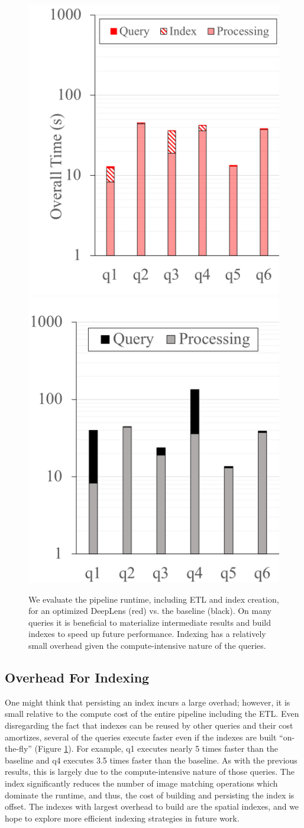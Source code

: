 \begin{figure}[t]
\centering
 \includegraphics[width=0.48\columnwidth]{figures/indexing_b.png}
 \includegraphics[width=0.48\columnwidth]{figures/indexing_a.png}
 \caption{We evaluate the pipeline runtime, including ETL and index creation, for an optimized \textsf{DeepLens} (red) vs. the baseline (black). On many queries it is beneficial to materialize intermediate results and build indexes to speed up future performance. Indexing has a relatively small overhead given the compute-intensive nature of the queries. \label{index} }
\end{figure}

\subsection{Overhead For Indexing}
One might think that persisting an index incurs a large overhad; however, it is small relative to the compute cost of the entire pipeline including the ETL.
Even disregarding the fact that indexes can be reused by other queries and their cost amortizes, several of the queries execute faster even if the indexes are built ``on-the-fly'' (Figure \ref{index}).
For example, q1 executes nearly 5 times faster than the baseline and q4 executes 3.5 times faster than the baseline.
As with the previous results, this is largely due to the compute-intensive nature of those queries.
The index significantly reduces the number of image matching operations which dominate the runtime, and thus, the cost of building and persisting the index is offset.
The indexes with largest overhead to build are the spatial indexes, and we hope to explore more efficient indexing strategies in future work.

